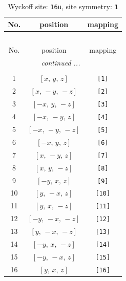 \documentclass[fleqn,8pt]{jsarticle}
\begin{document}
\begin{longtable}{ccc}
\caption{Wyckoff site: {\tt 16u}, site symmetry: {\tt 1}}
 \\
 \hline \hline
No. & position & mapping \\ \hline \endfirsthead

\multicolumn{2}{l}{\tablename\ \thetable{}} \\
 \hline \hline
No. & position & mapping \\ \hline \endhead

 \hline \hline
\multicolumn{2}{r}{\footnotesize\it continued ...} \\ \endfoot

 \hline \hline
\multicolumn{2}{r}{} \\ \endlastfoot

1 & $\left[ x,\, y,\, z \right]$ & {\tt [1]} \\ \hline
2 & $\left[ x,\, - y,\, - z \right]$ & {\tt [2]} \\ \hline
3 & $\left[ - x,\, y,\, - z \right]$ & {\tt [3]} \\ \hline
4 & $\left[ - x,\, - y,\, z \right]$ & {\tt [4]} \\ \hline
5 & $\left[ - x,\, - y,\, - z \right]$ & {\tt [5]} \\ \hline
6 & $\left[ - x,\, y,\, z \right]$ & {\tt [6]} \\ \hline
7 & $\left[ x,\, - y,\, z \right]$ & {\tt [7]} \\ \hline
8 & $\left[ x,\, y,\, - z \right]$ & {\tt [8]} \\ \hline
9 & $\left[ - y,\, x,\, z \right]$ & {\tt [9]} \\ \hline
10 & $\left[ y,\, - x,\, z \right]$ & {\tt [10]} \\ \hline
11 & $\left[ y,\, x,\, - z \right]$ & {\tt [11]} \\ \hline
12 & $\left[ - y,\, - x,\, - z \right]$ & {\tt [12]} \\ \hline
13 & $\left[ y,\, - x,\, - z \right]$ & {\tt [13]} \\ \hline
14 & $\left[ - y,\, x,\, - z \right]$ & {\tt [14]} \\ \hline
15 & $\left[ - y,\, - x,\, z \right]$ & {\tt [15]} \\ \hline
16 & $\left[ y,\, x,\, z \right]$ & {\tt [16]} \\
\end{longtable}
\end{document}
